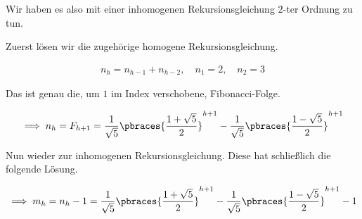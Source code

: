 \begin{solution}
Wir haben es also mit einer inhomogenen Rekursionsgleichung $2$-ter Ordnung zu tun.


Zuerst lösen wir die zugehörige homogene Rekursionsgleichung.

\begin{align*}
  n_h = n_{h-1} + n_{h-2},
  \quad
  n_1 = 2,
  \quad
  n_2 = 3
\end{align*}

Das ist genau die, um $1$ im Index verschobene, Fibonacci-Folge.

\begin{align*}
  \implies
  n_h
  =
  F_{h+1}
  =
  \frac{1}{\sqrt{5}}
  \pbraces
  {
    \frac{1 + \sqrt{5}}{2}
  }^{h+1}
  -
  \frac{1}{\sqrt{5}}
  \pbraces
  {
    \frac{1 - \sqrt{5}}{2}
  }^{h+1}
\end{align*}

Nun wieder zur inhomogenen Rekursionsgleichung.
Diese hat schließlich die folgende Lösung.

\begin{align*}
  \implies
  m_h
  =
  n_h - 1
  =
  \frac{1}{\sqrt{5}}
  \pbraces
  {
    \frac{1 + \sqrt{5}}{2}
  }^{h+1}
  -
  \frac{1}{\sqrt{5}}
  \pbraces
  {
    \frac{1 - \sqrt{5}}{2}
  }^{h+1}
  -
  1
\end{align*}

\begin{comment}

Das charakteristische Polynom und seine Nullstellen:

\begin{align*}
  \chi(x) = x^2 - x - 1 &\stackrel{!}{=} 0
  \iff
  x_{1,2} = \frac{1}{2} \pm \frac{\sqrt{5}}{2} \\
  c_1 + c_2 &\stackrel{!}{=} 2 \\
  c_1\Big(\frac{1}{2} + \frac{\sqrt{5}}{2}\Big) + c_2 \Big(\frac{1}{2} - \frac{\sqrt{5}}{2}\Big) &\stackrel{!}{=} 3 \\
  \implies c_1 = \frac{2\sqrt{5}}{5} + 1, c_2 &= \frac{-2\sqrt{5}}{5} + 1
\end{align*}

also
\begin{align*}
  n_h = \Big(\frac{2\sqrt{5}}{5} + 1\Big)\Big(\frac{1}{2} + \frac{\sqrt{5}}{2}\Big)^h + \Big(\frac{-2\sqrt{5}}{5} + 1 \Big)\Big(\frac{1}{2} - \frac{\sqrt{5}}{2}\Big)^h \\
  \implies
  m_h = \Big(\frac{2\sqrt{5}}{5} + 1\Big)\Big(\frac{1}{2} + \frac{\sqrt{5}}{2}\Big)^h + \Big(\frac{-2\sqrt{5}}{5} + 1 \Big)\Big(\frac{1}{2} - \frac{\sqrt{5}}{2}\Big)^h - 1
\end{align*}

\end{comment}

\end{solution}

